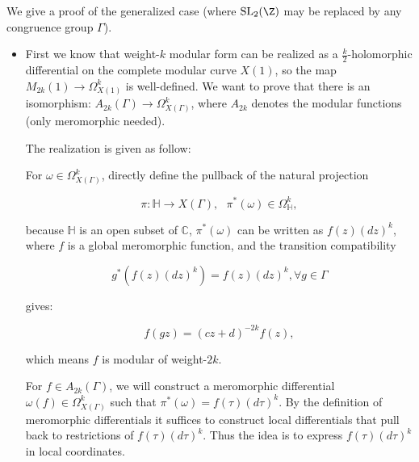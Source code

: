 \begin{enumerate}[1]
\begin{proofc}[解答]
        We give a proof of the generalized case (where $\mathrm{SL}_2(\Z)$ may be replaced by any congruence group $\Gamma$).
        \begin{itemize}
            \item First we know that weight-$k$ modular form can be realized as a $\frac{k}{2}$-holomorphic differential on the complete modular curve $X(1)$, so the map $M_{2k}(1) \to \Omega_{X(1)}^k$ is well-defined.
             We want to prove that there is an isomorphism: $A_{2k}(\Gamma) \to \Omega^{k}_{X(\Gamma)}$, where $A_{2k}$ denotes the modular functions (only meromorphic needed).

            The realization is given as follow: 

            For $\omega \in \Omega^{k}_{X(\Gamma)}$, directly define the pullback of the natural projection 
            
            $$\pi: \mathbb{H} \to X(\Gamma), \ \ \ \pi^* (\omega) \in \Omega_{\mathbb{H}}^k, $$
            
            because $\mathbb{H}$ is an open subset of $\mathbb{C}$, $\pi^*(\omega)$ can be written as $f(z)(dz)^k$, where $f$ is a global meromorphic function, 
            and the transition compatibility 
            
            $$g^*(f(z)(dz)^k) = f(z)(dz)^k, \forall g \in \Gamma$$
            
            gives: 
            
            $$f(gz) = (cz+d)^{-2k}f(z),$$ 
            
            which means $f$ is modular of weight-$2k$.

            For $f \in A_{2k}(\Gamma)$, 
            we will construct a meromorphic differential \( \omega(f) \in \Omega^{k}_{X(\Gamma)} \) such that \( \pi^*(\omega) = f(\tau)(d\tau)^k \). 
            By the definition of meromorphic differentials it suffices to construct local differentials that pull back to restrictions of \( f(\tau)(d\tau)^k \). 
            Thus the idea is to express \( f(\tau)(d\tau)^k \) in local coordinates.


\end{itemize}
\end{proofc}
\end{enumerate}
